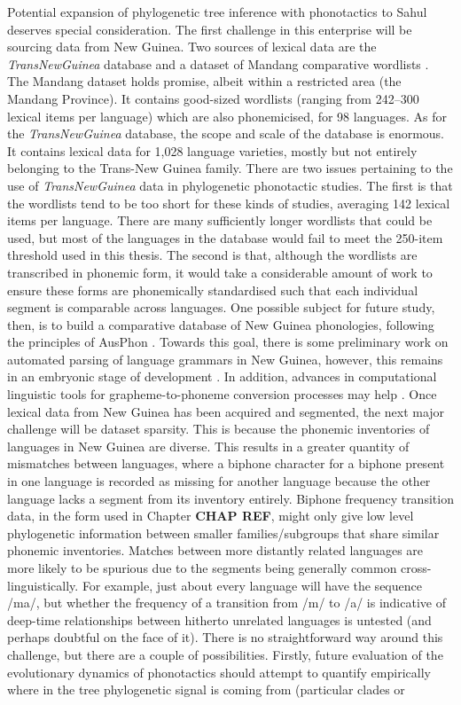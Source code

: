 Potential expansion of phylogenetic tree inference with phonotactics to Sahul deserves special consideration. The first challenge in this enterprise will be sourcing data from New Guinea. Two sources of lexical data are the \emph{TransNewGuinea} database \autocite{greenhill_transnewguinea_2015} and a dataset of Mandang comparative wordlists \autocite{zgraggen_comparative_1980}. The Mandang dataset holds promise, albeit within a restricted area (the Mandang Province). It contains good-sized wordlists (ranging from 242--300 lexical items per language) which are also phonemicised, for 98 languages. As for the \emph{TransNewGuinea} database, the scope and scale of the database is enormous. It contains lexical data for 1,028 language varieties, mostly but not entirely belonging to the Trans-New Guinea family. There are two issues pertaining to the use of \emph{TransNewGuinea} data in phylogenetic phonotactic studies. The first is that the wordlists tend to be too short for these kinds of studies, averaging 142 lexical items per language. There are many sufficiently longer wordlists that could be used, but most of the languages in the database would fail to meet the 250-item threshold used in this thesis. The second is that, although the wordlists are transcribed in phonemic form, it would take a considerable amount of work to ensure these forms are phonemically standardised such that each individual segment is comparable across languages. One possible subject for future study, then, is to build a comparative database of New Guinea phonologies, following the principles of AusPhon \autocite{round_ausphon-lexicon_2017}. Towards this goal, there is some preliminary work on automated parsing of language grammars in New Guinea, however, this remains in an embryonic stage of development \autocite{round_automated_2020}. In addition, advances in computational linguistic tools for grapheme-to-phoneme conversion processes may help \autocite[see][]{salesky_corpus_2020}. Once lexical data from New Guinea has been acquired and segmented, the next major challenge will be dataset sparsity. This is because the phonemic inventories of languages in New Guinea are diverse. This results in a greater quantity of mismatches between languages, where a biphone character for a biphone present in one language is recorded as missing for another language because the other language lacks a segment from its inventory entirely. Biphone frequency transition data, in the form used in Chapter \textbf{CHAP REF}, might only give low level phylogenetic information between smaller families/subgroups that share similar phonemic inventories. Matches between more distantly related languages are more likely to be spurious due to the segments being generally common cross-linguistically. For example, just about every language will have the sequence /ma/, but whether the frequency of a transition from /m/ to /a/ is indicative of deep-time relationships between hitherto unrelated languages is untested (and perhaps doubtful on the face of it). There is no straightforward way around this challenge, but there are a couple of possibilities. Firstly, future evaluation of the evolutionary dynamics of phonotactics should attempt to quantify empirically where in the tree phylogenetic signal is coming from (particular clades or 